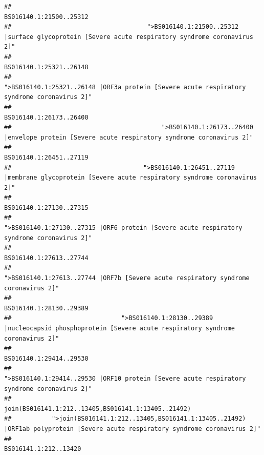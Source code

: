 \documentclass[
]{article}
\begin{document}
\begin{verbatim}
##                                                                                                                BS016140.1:21500..25312 
##                                     ">BS016140.1:21500..25312 |surface glycoprotein [Severe acute respiratory syndrome coronavirus 2]" 
##                                                                                                                BS016140.1:25321..26148 
##                                            ">BS016140.1:25321..26148 |ORF3a protein [Severe acute respiratory syndrome coronavirus 2]" 
##                                                                                                                BS016140.1:26173..26400 
##                                         ">BS016140.1:26173..26400 |envelope protein [Severe acute respiratory syndrome coronavirus 2]" 
##                                                                                                                BS016140.1:26451..27119 
##                                    ">BS016140.1:26451..27119 |membrane glycoprotein [Severe acute respiratory syndrome coronavirus 2]" 
##                                                                                                                BS016140.1:27130..27315 
##                                             ">BS016140.1:27130..27315 |ORF6 protein [Severe acute respiratory syndrome coronavirus 2]" 
##                                                                                                                BS016140.1:27613..27744 
##                                                    ">BS016140.1:27613..27744 |ORF7b [Severe acute respiratory syndrome coronavirus 2]" 
##                                                                                                                BS016140.1:28130..29389 
##                              ">BS016140.1:28130..29389 |nucleocapsid phosphoprotein [Severe acute respiratory syndrome coronavirus 2]" 
##                                                                                                                BS016140.1:29414..29530 
##                                            ">BS016140.1:29414..29530 |ORF10 protein [Severe acute respiratory syndrome coronavirus 2]" 
##                                                                                    join(BS016141.1:212..13405,BS016141.1:13405..21492) 
##           ">join(BS016141.1:212..13405,BS016141.1:13405..21492) |ORF1ab polyprotein [Severe acute respiratory syndrome coronavirus 2]" 
##                                                                                                                  BS016141.1:212..13420 

\end{verbatim}
\end{document}
